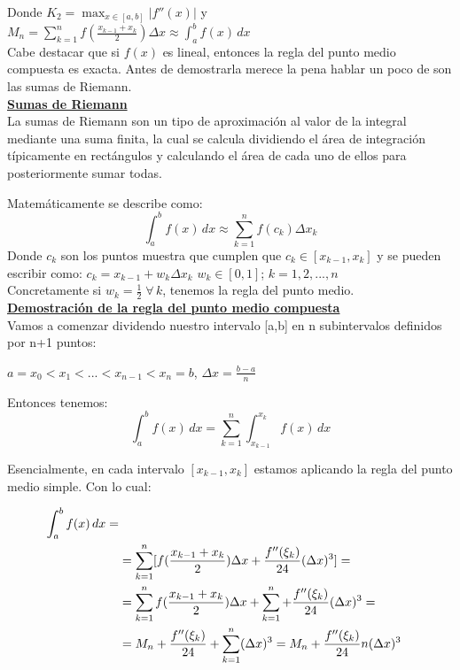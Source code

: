 \documentclass{article}
\begin{document}
			Donde $K_2=\max_{x \in [a,b]}\left\lvert f''(x) \right\rvert$
			y $M_n=\sum_{k = 1}^{n}f(\frac{x_{k-1}+x_k}{2})\Delta x \approx \int_{a}^{b} f(x) \,dx$ \\
			
			Cabe destacar que si $f(x)$ es lineal, entonces la regla del  punto medio compuesta es exacta. Antes de demostrarla merece la pena hablar un poco de  son las sumas de Riemann.\\
			
			\underline{\textbf{Sumas de Riemann}} \\
			
			La sumas de Riemann son un tipo de aproximación al valor de la integral mediante una suma finita, la cual se calcula dividiendo el área de integración típicamente en rectángulos y calculando el área de  cada uno de ellos para posteriormente sumar todas. \\
			\par
			Matemáticamente se describe como: 
			\begin{equation}
				\int_{a}^{b} f(x) \,dx \approx \sum_{k = 1}^{n} f(c_k)\Delta x_k   
			\end{equation}
			Donde $c_k$ son los puntos muestra que cumplen que $c_k \in [x_{k-1},x_k]$ y se pueden escribir como: $c_k=x_{k-1}+w_k\Delta x_k$ \;$w_k \in [0,1]$; $k=1,2,...,n$ \\

			Concretamente si $w_k=\frac{1}{2}\;\forall\,k$, tenemos la regla del punto medio.\\

			\underline{\textbf{Demostración de la regla del punto medio compuesta}}\\
			
			Vamos a comenzar dividendo nuestro intervalo [a,b] en n subintervalos definidos por n+1 puntos: 

			\begin{center}
				$a=x_0<x_1<...<x_{n-1}<x_n=b$, $\Delta x=\frac{b-a}{n} $ 
			\end{center}

			Entonces tenemos: 
			\begin{equation}
				\int_{a}^{b} f(x) \,dx=\sum_{k = 1}^{n}\int_{x_{k-1}}^{x_k} f(x) \,dx    
			\end{equation}
			
			Esencialmente, en cada intervalo $[x_{k-1},x_k]$ estamos aplicando la regla del punto medio simple. Con lo cual:
			
			\begin{align}
				\int_{a}^{b} f(x) \,dx= \notag \\
				&=\sum_{k = 1}^{n}[f(\frac{x_{k-1}+x_k}{2})\Delta x+\frac{f''(\xi_k)}{24}(\Delta x){^3}]= \notag \\
				&=\sum_{k = 1}^{n}f(\frac{x_{k-1}+x_k}{2})\Delta x + \sum_{k = 1}^{n}+\frac{f''(\xi_k)}{24}(\Delta x){^3}= \notag \\
				&=M_n+\frac{f''(\xi_k)}{24}+\sum_{k = 1}^{n}(\Delta x){^3}=M_n+\frac{f''(\xi_k)}{24}n(\Delta x){^3}
			\end{align}
			
\end{document}
